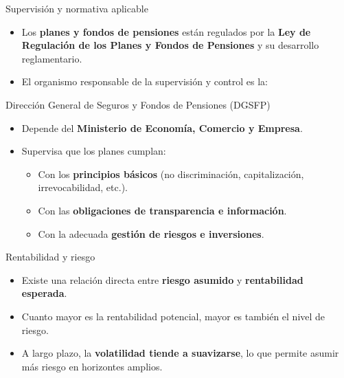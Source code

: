 \documentclass[
  ignorenonframetext,
  aspectratio=54,
  spanish,
]{beamer}
\providecommand{\tightlist}{%
  \setlength{\itemsep}{0pt}\setlength{\parskip}{0pt}}
\begin{document}
\begin{frame}{Supervisión y normativa aplicable}
\label{supervisiuxf3n-y-normativa-aplicable}
\begin{itemize}
\tightlist
\item
  Los \textbf{planes y fondos de pensiones} están regulados por la
  \textbf{Ley de Regulación de los Planes y Fondos de Pensiones} y su
  desarrollo reglamentario.
\item
  El organismo responsable de la supervisión y control es la:
\end{itemize}

\begin{block}{Dirección General de Seguros y Fondos de Pensiones
(DGSFP)}
\label{direcciuxf3n-general-de-seguros-y-fondos-de-pensiones-dgsfp}
\begin{itemize}
\tightlist
\item
  Depende del \textbf{Ministerio de Economía, Comercio y Empresa}.
\item
  Supervisa que los planes cumplan:

  \begin{itemize}
  \tightlist
  \item
    Con los \textbf{principios básicos} (no discriminación,
    capitalización, irrevocabilidad, etc.).
  \item
    Con las \textbf{obligaciones de transparencia e información}.
  \item
    Con la adecuada \textbf{gestión de riesgos e inversiones}.
  \end{itemize}
\end{itemize}
\end{block}
\end{frame}

\begin{frame}{Rentabilidad y riesgo}
\label{rentabilidad-y-riesgo}
\begin{itemize}
\tightlist
\item
  Existe una relación directa entre \textbf{riesgo asumido} y
  \textbf{rentabilidad esperada}.
\item
  Cuanto mayor es la rentabilidad potencial, mayor es también el nivel
  de riesgo.
\item
  A largo plazo, la \textbf{volatilidad tiende a suavizarse}, lo que
  permite asumir más riesgo en horizontes amplios.
\end{itemize}
\end{frame}
\end{document}
